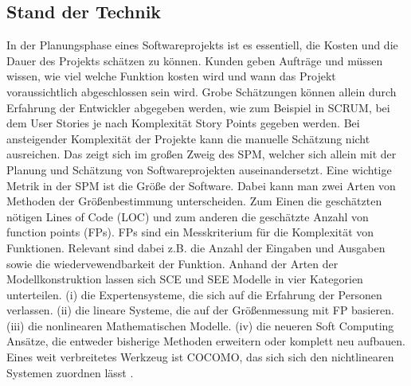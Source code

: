 \subsection{Stand der Technik}
In der Planungsphase eines Softwareprojekts ist es essentiell, die Kosten und die Dauer des Projekts schätzen zu können. Kunden geben Aufträge und müssen wissen, wie viel welche Funktion kosten wird und wann das Projekt voraussichtlich abgeschlossen sein wird. Grobe Schätzungen können allein durch Erfahrung der Entwickler abgegeben werden, wie zum Beispiel in SCRUM, bei dem User Stories je nach Komplexität Story Points gegeben werden. Bei ansteigender Komplexität der Projekte kann die manuelle Schätzung nicht ausreichen. Das zeigt sich im großen Zweig des SPM, welcher sich allein mit der Planung und Schätzung von Softwareprojekten auseinandersetzt. Eine wichtige Metrik in der SPM ist die Größe der Software. Dabei kann man zwei Arten von Methoden der Größenbestimmung unterscheiden. Zum Einen die geschätzten nötigen Lines of Code (LOC) und zum anderen die geschätzte Anzahl von function points (FPs). FPs sind ein Messkriterium für die Komplexität von Funktionen. Relevant sind dabei z.B. die Anzahl der Eingaben und Ausgaben sowie die wiedervewendbarkeit der Funktion. Anhand der Arten der Modellkonstruktion lassen sich SCE und SEE Modelle in vier Kategorien unterteilen. (i) die Expertensysteme, die sich auf die Erfahrung der Personen verlassen\cite{Heemstra1992}. (ii) die lineare Systeme, die auf der Größenmessung mit FP basieren\cite{Matson1994}. (iii) die nonlinearen Mathematischen Modelle. (iv) die neueren Soft Computing Ansätze, die entweder bisherige Methoden erweitern oder komplett neu aufbauen\cite{Huang2007}\cite{Huang2006}. Eines weit verbreitetes Werkzeug ist COCOMO, das sich sich den nichtlinearen Systemen zuordnen lässt \cite{Jain2016}.
\vspace{4.0cm}

